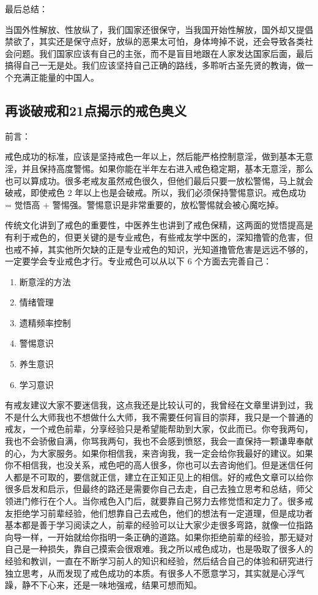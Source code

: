 \documentclass{ctexart}
\begin{document}
最后总结：

当国外性解放、性放纵了，我们国家还很保守，当我国开始性解放，国外却又提倡禁欲了，其实还是保守点好，放纵的恶果太可怕，身体垮掉不说，还会导致各类社会问题。我们国家应该有自己的主张，而不是盲目地跟在人家发达国家后面，最后搞得自己一无是处。我们应该坚持自己正确的路线，多聆听古圣先贤的教诲，做一个充满正能量的中国人。

\subsection{再谈破戒和21点揭示的戒色奥义}

前言：

戒色成功的标准，应该是坚持戒色一年以上，然后能严格控制意淫，做到基本无意淫，并且保持高度警惕。如果你能在半年左右进入戒色稳定期，基本无意淫，那么也可以算成功。很多老戒友虽然戒色很久，但他们最后只要一放松警惕，马上就会破戒，即使戒色 2 年以上也是会破戒。所以，我们必须保持警惕意识。戒色成功 = 觉悟高 + 警惕强。警惕意识是非常重要的，放松警惕就会被心魔吃掉。

传统文化讲到了戒色的重要性，中医养生也讲到了戒色保精，这两面的觉悟提高是有利于戒色的，但更关键的是专业戒色，有些戒友学中医的，深知撸管的危害，但也戒不掉，其实他所欠缺的正是专业戒色的知识，光知道撸管危害是远远不够的，一定要学会专业戒色才行。专业戒色可以从以下 6 个方面去完善自己：

\begin{multicols}{2}
    \begin{enumerate}
        \item 断意淫的方法
        \item 情绪管理
        \item 遗精频率控制
        \item 警惕意识
        \item 养生意识
        \item 学习意识
    \end{enumerate}
\end{multicols}

有戒友建议大家不要迷信我，这点我还是比较认可的，我曾经在文章里讲到过，我不是什么大师我也不想做什么大师，我不需要任何盲目的崇拜，我只是一个普通的戒友，一个戒色前辈，分享经验只是希望能帮助到大家，仅此而已。你夸我两句，我也不会骄傲自满，你骂我两句，我也不会感到愤怒，我会一直保持一颗谦卑奉献的心，为大家服务。如果你相信我，来咨询我，我一定会给你我最好的建议。如果你不相信我，也没关系，戒色吧的高人很多，你也可以去咨询他们。但是迷信任何人都是不可取的，要信就正信，建立在正知正见上的相信。好的戒色文章可以给你很多启发和启示，但最终的路还是需要你自己去走，自己去独立思考和总结，师父领进门修行在个人。当你戒色入门后，就要靠自己努力去修觉悟和定力了。很多戒友拒绝学习前辈经验，他们想靠自己去戒色，他们的想法有一定道理，但是成功者基本都是善于学习阅读之人，前辈的经验可以让大家少走很多弯路，就像一位指路向导一样，一开始就给你指明一条正确的道路。如果你拒绝前辈的经验，那无疑对自己是一种损失，靠自己摸索会很艰难。我之所以戒色成功，也是吸取了很多人的经验和教训，一直在不断学习前人的知识和经验，然后结合自己的体验和研究进行独立思考，从而发现了戒色成功的本质。有很多人不愿意学习，其实就是心浮气躁，静不下心来，还是一味地强戒，结果可想而知。
\end{document}
